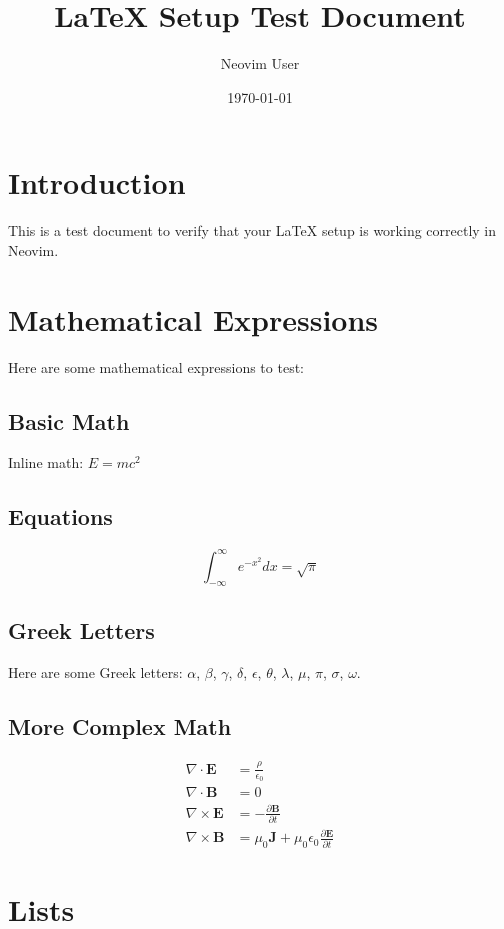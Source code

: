 \documentclass{article}
\title{LaTeX Setup Test Document}
\author{Neovim User}
\date{\today}
\begin{document}
\maketitle

\section{Introduction}
This is a test document to verify that your LaTeX setup is working correctly in Neovim.

\section{Mathematical Expressions}
Here are some mathematical expressions to test:

\subsection{Basic Math}
Inline math: $E = mc^2$

\subsection{Equations}
\begin{equation}
\int_{-\infty}^{\infty} e^{-x^2} dx = \sqrt{\pi}
\label{eq:gaussian}
\end{equation}

\subsection{Greek Letters}
Here are some Greek letters: $\alpha$, $\beta$, $\gamma$, $\delta$, $\epsilon$, $\theta$, $\lambda$, $\mu$, $\pi$, $\sigma$, $\omega$.

\subsection{More Complex Math}
\begin{align}
\nabla \cdot \mathbf{E} &= \frac{\rho}{\epsilon_0} \\
\nabla \cdot \mathbf{B} &= 0 \\
\nabla \times \mathbf{E} &= -\frac{\partial \mathbf{B}}{\partial t} \\
\nabla \times \mathbf{B} &= \mu_0 \mathbf{J} + \mu_0 \epsilon_0 \frac{\partial \mathbf{E}}{\partial t}
\end{align}

\section{Lists}
\end{document}
